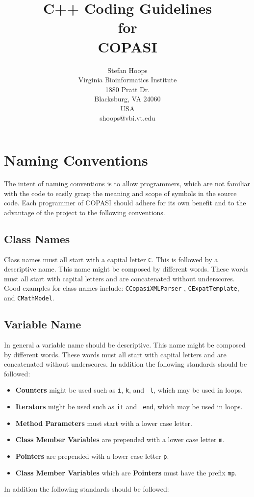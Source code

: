 \documentclass[12pt]{book}
\begin{document}
 

\title{C++ Coding Guidelines \\ for \\ COPASI}
\author{Stefan Hoops\\
        Virginia Bioinformatics Institute \\ 1880 Pratt Dr. \\
        Blacksburg, VA 24060 \\ USA \\ shoops@vbi.vt.edu}

\maketitle

\tableofcontents

\chapter{Naming Conventions}
The intent of naming conventions is to allow programmers, which are
not familiar with the code to easily grasp the meaning and scope of
symbols in the source code. Each programmer of COPASI should adhere
for its own benefit and to the advantage of the project to the
following conventions.

\section{Class Names}
Class names must all start with a capital letter {\tt C}. This is
followed by a descriptive name. This name might be composed by
different words. These words must all start with capital letters and
are concatenated without underscores. Good examples for class names
include: 
  {\tt CCopasiXMLParser} , {\tt CExpatTemplate}, and {\tt CMathModel}.

\section{Variable Name}
In general a variable name should be descriptive. This name might be
composed by different words. These words must all start with capital
letters and are concatenated without underscores. In addition the
following standards should be followed:  

\begin{itemize}
\item {\bf Counters} might be used such as {\tt i}, {\tt k}, and {\tt
  l}, which may be used in loops.
\item {\bf Iterators} might be used such as {\tt it} and {\tt
  end}, which may be used in loops. 
\item {\bf Method Parameters} must start with a lower case letter.
\item {\bf Class Member Variables} are prepended with a lower case
  letter {\tt m}.
\item {\bf Pointers} are prepended with a lower case letter {\tt p}. 
\item {\bf Class Member Variables} which are {\bf Pointers} must have the
  prefix {\tt mp}.
\end{itemize}
 In addition the
following standards should be followed:  
\end{document}

